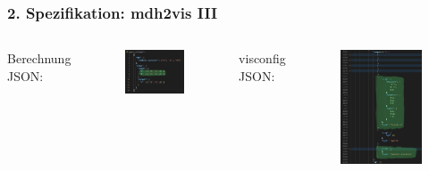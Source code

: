 \documentclass{presentation}
\begin{document}
\begin{frame}
	\frametitle{2. Spezifikation: mdh2vis III}
	\begin{columns}
		Berechnung JSON:
		\begin{figure}
			\includegraphics[width=\linewidth]{images/gemm_mdh.png}
		\end{figure}
		visconfig JSON:
		\begin{figure}
			\includegraphics[width=0.7\linewidth]{images/gemm_mdh_vis.png}
		\end{figure}
	\end{columns}
\end{frame}
\end{document}
